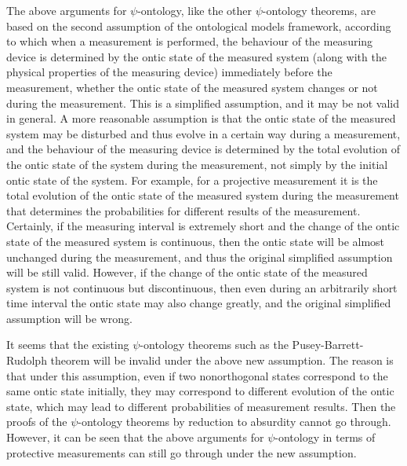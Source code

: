 The above arguments for $\psi$-ontology, like the other $\psi$-ontology theorems, are based on the second assumption of the ontological models framework, according to which when a measurement is performed, the behaviour of the measuring device is determined by the ontic state of the measured system (along with the physical properties of the measuring device) immediately before the measurement, whether the ontic state of the measured system changes or not during the measurement. This is a simplified assumption, and it may be not valid in general. A more reasonable assumption is that the ontic state of the measured system may be disturbed and thus evolve in a certain way during a measurement, and the behaviour of the measuring device is determined by the total evolution of the ontic state of the system during the measurement, not simply by the initial ontic state of the system. 
For example, for a projective measurement it is the total evolution of the ontic state of the measured system during the measurement that determines the probabilities for different results of the measurement. 
Certainly, if the measuring interval is extremely short and the change of the ontic state of the measured system is continuous, then the ontic state will be almost unchanged during the measurement, and thus the original simplified assumption will be still valid. However, if the change of the ontic state of the measured system is not continuous but discontinuous, then even during an arbitrarily short time interval the ontic state may also change greatly, and the original simplified assumption will be wrong.

It seems that the existing $\psi$-ontology theorems such as the Pusey-Barrett-Rudolph theorem will be invalid under the above new assumption. The reason is that under this assumption, even if two nonorthogonal states correspond to the same ontic state initially, they may correspond to different evolution of the ontic state, which may lead to different probabilities of measurement results. Then the proofs of the $\psi$-ontology theorems by reduction to absurdity cannot go through. 
However, it can be seen that the above arguments for $\psi$-ontology in terms of protective measurements can still go through under the new assumption. 

